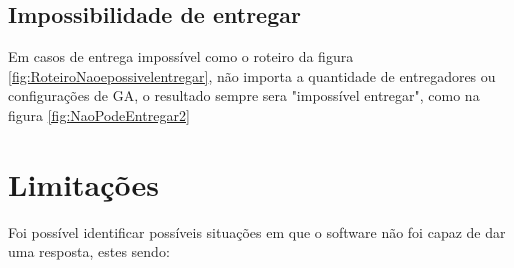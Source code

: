 \begin{center}
	\label{fig:NaoPodeEntregar}
\end{center}


\subsection{Impossibilidade de entregar}

Em casos de entrega impossível como o roteiro da figura \ref{fig:RoteiroNaoepossivelentregar}, não importa a quantidade de entregadores ou configurações de GA, o resultado sempre sera "impossível entregar", como na figura \ref{fig:NaoPodeEntregar2}

\begin{center}
	\label{fig:RoteiroNaoepossivelentregar}
\end{center}

\begin{center}
	\label{fig:NaoPodeEntregar2}
\end{center}



\section{Limitações}
Foi possível identificar possíveis situações em que o software não foi capaz de dar uma resposta, estes sendo:

